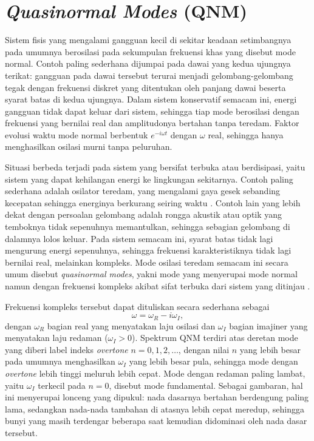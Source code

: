 \section{\textit{Quasinormal Modes} (QNM)}
\label{sec:qnm}

\noindent Sistem fisis yang mengalami gangguan kecil di sekitar keadaan setimbangnya pada
umumnya berosilasi pada sekumpulan frekuensi khas yang disebut mode normal. Contoh paling
sederhana dijumpai pada dawai yang kedua ujungnya terikat: gangguan pada dawai tersebut
terurai menjadi gelombang-gelombang tegak dengan frekuensi diskret yang ditentukan oleh
panjang dawai beserta syarat batas di kedua ujungnya. Dalam sistem konservatif semacam ini,
energi gangguan tidak dapat keluar dari sistem, sehingga tiap mode berosilasi dengan
frekuensi yang bernilai real dan amplitudonya bertahan tanpa teredam. Faktor evolusi waktu
mode normal berbentuk $e^{-i\omega t}$ dengan $\omega$ real, sehingga hanya menghasilkan
osilasi murni tanpa peluruhan.

Situasi berbeda terjadi pada sistem yang bersifat terbuka atau berdisipasi, yaitu sistem
yang dapat kehilangan energi ke lingkungan sekitarnya. Contoh paling sederhana adalah
osilator teredam, yang mengalami gaya gesek sebanding kecepatan sehingga energinya berkurang
seiring waktu \parencite{boas2006}. Contoh lain yang lebih dekat dengan persoalan gelombang
adalah rongga akustik atau optik yang temboknya tidak sepenuhnya memantulkan, sehingga
sebagian gelombang di dalamnya lolos keluar. Pada sistem semacam ini, syarat batas tidak lagi
mengurung energi sepenuhnya, sehingga frekuensi karakteristiknya tidak lagi bernilai real,
melainkan kompleks. Mode osilasi teredam semacam ini secara umum disebut
\textit{quasinormal modes}, yakni mode yang menyerupai mode normal namun dengan frekuensi
kompleks akibat sifat terbuka dari sistem yang ditinjau \parencite{Kokkotas1999}.

Frekuensi kompleks tersebut dapat dituliskan secara sederhana sebagai
\begin{equation}
    \omega = \omega_R - i\omega_I,
    \label{eq:omega-qnm}
\end{equation}
dengan $\omega_R$ bagian real yang menyatakan laju osilasi dan $\omega_I$ bagian imajiner
yang menyatakan laju redaman ($\omega_I > 0$). Spektrum QNM terdiri atas deretan mode yang
diberi label indeks \textit{overtone} $n = 0, 1, 2, \dots$, dengan nilai $n$ yang lebih besar
pada umumnya menghasilkan $\omega_I$ yang lebih besar pula, sehingga mode dengan
\textit{overtone} lebih tinggi meluruh lebih cepat. Mode dengan redaman paling lambat, yaitu
$\omega_I$ terkecil pada $n = 0$, disebut mode fundamental. Sebagai gambaran, hal ini
menyerupai lonceng yang dipukul: nada dasarnya bertahan berdengung paling lama, sedangkan
nada-nada tambahan di atasnya lebih cepat meredup, sehingga bunyi yang masih terdengar
beberapa saat kemudian didominasi oleh nada dasar tersebut.

